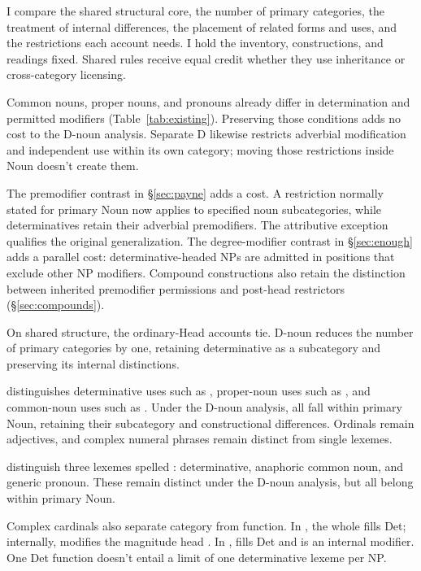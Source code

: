 \documentclass[12pt]{article}
\begin{document}
I compare the shared structural core, the number of primary categories, the treatment of internal differences, the placement of related forms and uses, and the restrictions each account needs. I hold the inventory, constructions, and readings fixed. Shared rules receive equal credit whether they use inheritance or cross-category licensing.

Common nouns, proper nouns, and pronouns already differ in determination and permitted modifiers (Table~\ref{tab:existing}). Preserving those conditions adds no cost to the D-noun analysis. Separate D likewise restricts adverbial modification and independent use within its own category; moving those restrictions inside Noun doesn't create them.

The premodifier contrast in §\ref{sec:payne} adds a cost. A restriction normally stated for primary Noun now applies to specified noun subcategories, while determinatives retain their adverbial premodifiers. The attributive  exception qualifies the original generalization. The degree-modifier contrast in §\ref{sec:enough} adds a parallel cost: determinative-headed NPs are admitted in positions that exclude other NP modifiers. Compound constructions also retain the distinction between inherited premodifier permissions and post-head restrictors (§\ref{sec:compounds}).

On shared structure, the ordinary-Head accounts tie. D-noun reduces the number of primary categories by one, retaining determinative as a subcategory and preserving its internal distinctions.

\textcite{reynolds2026numerals} distinguishes determinative uses such as , proper-noun uses such as , and common-noun uses such as . Under the D-noun analysis, all fall within primary Noun, retaining their subcategory and constructional differences. Ordinals remain adjectives, and complex numeral phrases remain distinct from single lexemes.

\textcite[797--798]{payne2013anaphoric} distinguish three lexemes spelled : determinative, anaphoric common noun, and generic pronoun. These remain distinct under the D-noun analysis, but all belong within primary Noun.

Complex cardinals also separate category from function. In , the whole  fills Det; internally,  modifies the magnitude head  \citep[§4]{reynolds2026numerals}. In ,  fills Det and  is an internal modifier. One Det function doesn't entail a limit of one determinative lexeme per NP.
\end{document}
